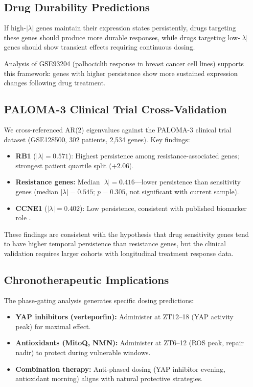 \documentclass[11pt,letterpaper]{article}
\begin{document}
\subsection{Drug Durability Predictions}

If high-$|\lambda|$ genes maintain their expression states persistently, drugs targeting these genes should produce more durable responses, while drugs targeting low-$|\lambda|$ genes should show transient effects requiring continuous dosing.

Analysis of GSE93204 (palbociclib response in breast cancer cell lines) supports this framework: genes with higher persistence show more sustained expression changes following drug treatment.

\subsection{PALOMA-3 Clinical Trial Cross-Validation}

We cross-referenced AR(2) eigenvalues against the PALOMA-3 clinical trial dataset (GSE128500, 302 patients, 2,534 genes). Key findings:

\begin{itemize}
\item \textbf{RB1} ($|\lambda| = 0.571$): Highest persistence among resistance-associated genes; strongest patient quartile split ($+2.06$).
\item \textbf{Resistance genes:} Median $|\lambda| = 0.416$---lower persistence than sensitivity genes (median $|\lambda| = 0.545$; $p = 0.305$, not significant with current sample).
\item \textbf{CCNE1} ($|\lambda| = 0.402$): Low persistence, consistent with published biomarker role \citep{turner2019overall}.
\end{itemize}

These findings are consistent with the hypothesis that drug sensitivity genes tend to have higher temporal persistence than resistance genes, but the clinical validation requires larger cohorts with longitudinal treatment response data.

\subsection{Chronotherapeutic Implications}

The phase-gating analysis generates specific dosing predictions:

\begin{itemize}
\item \textbf{YAP inhibitors (verteporfin):} Administer at ZT12--18 (YAP activity peak) for maximal effect.
\item \textbf{Antioxidants (MitoQ, NMN):} Administer at ZT6--12 (ROS peak, repair nadir) to protect during vulnerable windows.
\item \textbf{Combination therapy:} Anti-phased dosing (YAP inhibitor evening, antioxidant morning) aligns with natural protective strategies.
\end{itemize}
\end{document}
